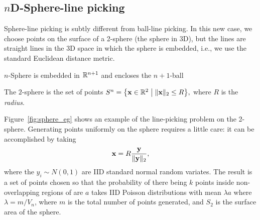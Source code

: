 \subsection{$n$D-Sphere-line picking}
\label{sec:nsphere_line}

Sphere-line picking is subtly different from ball-line picking. In
this new case, we choose points on the surface of a 2-sphere (the
sphere in 3D), but the lines are straight lines in the 3D space in
which the sphere is embedded, i.e., we use the standard Euclidean
distance metric.

$n$-Sphere is embedded in $\mathbb{R}^{n+1}$ and encloses the $n+1$-ball

The $2$-sphere is the set of points $S^n = \big\{ {\mathbf x} \in \mathbb{R}^2
\; \big| \; \|{\mathbf x} \|_2 \leq R \big\},$ where $R$ is the {\em
  radius}.

Figure~\ref{fig:sphere_eg} shows an example of the line-picking
problem on the 2-sphere. Generating points uniformly on the sphere
requires a little care: it can be accomplished by taking
\cite{marsaglia72:_choos_point_surfac_spher}
\begin{equation}
    \label{eq:x_surface_sphere2}
    {\mathbf x} = R \frac{{\mathbf y}}{\| {\mathbf y} \|_2}, 
\end{equation}
where the $y_i \sim N(0,1)$ are IID standard normal random variates.
The result is a set of points chosen so that the probability of there
being $k$ points inside non-overlapping regions of are $a$ takes
IID Poisson distributions with mean $\lambda a$ where $\lambda =
m/V_n$, where $m$ is the total number of points generated, and $S_2$
is the surface area of the sphere.

